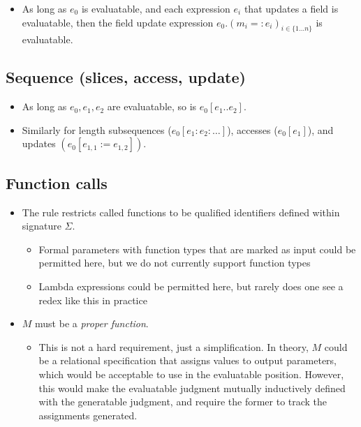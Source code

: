 \documentclass[11pt]{article}
\begin{document}
\begin{itemize}
\item As long as \(e_0\) is evaluatable, and each expression \(e_i\) that updates a
field is evaluatable, then the field update expression \(e_0.\left(m_i =:
  e_i\right)_{i \in \{1 \ldots n\}}\) is evaluatable.
\end{itemize}

\subsection{Sequence (slices, access, update)}
\label{sec:org324d9e5}

\begin{itemize}
\item As long as \(e_0, e_1, e_2\) are evaluatable, so is \(e_0[e_1 .. e_2]\).

\item Similarly for length subsequences (\(e_0[e_1 : e_2 : \ldots]\)), accesses
(\(e_0[e_1]\)), and updates \((e_0[e_{1,1} := e_{1,2}])\).
\end{itemize}

\subsection{Function calls}
\label{sec:org56012c4}

\begin{itemize}
\item The rule restricts called functions to be qualified identifiers defined within signature \(\Sigma\).
\begin{itemize}
\item Formal parameters with function types that are marked as input could be
permitted here, but we do not currently support function types
\item Lambda expressions could be permitted here, but rarely does one see a redex like this in practice
\end{itemize}

\item \(M\) must be a \emph{proper function}.
\begin{itemize}
\item This is not a hard requirement, just a simplification. In theory, \(M\)
could be a relational specification that assigns values to output
parameters, which would be acceptable to use in the evaluatable position.
However, this would make the evaluatable judgment mutually inductively
defined with the generatable judgment, and require the former to track the
assignments generated.
\end{itemize}
\end{itemize}
\end{document}
